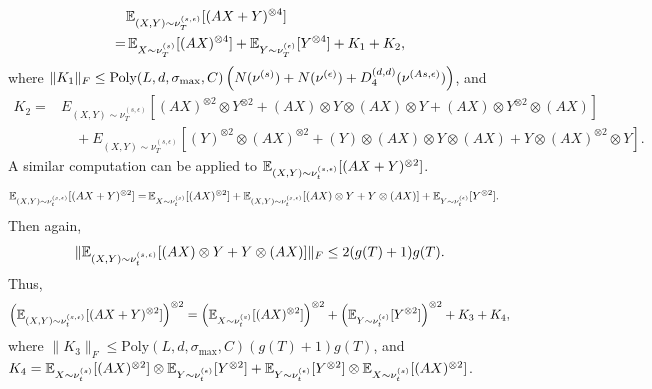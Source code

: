 \begin{align*}
& \mathbb{E}_{(X,Y)\sim \nu_T^{(s,\epsilon)}} [(AX+Y)^{\otimes 4}]\\
 = & \,\mathbb{E}_{X\sim \nu_T^{(s)}}[(AX)^{\otimes 4}] + \mathbb{E}_{Y\sim \nu_T^{(\epsilon)}}[Y^{\otimes 4}] + K_1 +K_2,
\end{align*}
where $\|K_1\|_F \le\text{Poly}(L, d, \sigma_{\max}, C)\left(N(\nu^{(s)})+N(\nu^{(\epsilon)})+D_4^{(d,d)}(\nu^{(As,\epsilon)}) \right) $, and 
\begin{align*}
K_2  = & E_{(X,Y)\sim \nu_T^{(s,\epsilon)}} [ (AX)^{\otimes 2}\otimes Y^{\otimes 2} + (AX)\otimes Y\otimes (AX)\otimes Y + (AX)\otimes Y^{\otimes 2}\otimes (AX)]\\
& \quad+  E_{(X,Y)\sim \nu_T^{(s,\epsilon)}} [ (Y)^{\otimes 2}\otimes (AX)^{\otimes 2} + (Y)\otimes (AX)\otimes Y\otimes (AX) + Y\otimes (AX)^{\otimes 2}\otimes Y]. 
\end{align*}
A similar computation can be applied to $\mathbb{E}_{(X,Y)\sim \nu_t^{(s,\epsilon)}} [(AX+Y)^{\otimes 2}]$.
\begin{align*}
\mathbb{E}_{(X,Y)\sim \nu_t^{(s,\epsilon)}} [(AX+Y)^{\otimes 2}]= & \, \mathbb{E}_{X\sim \nu_t^{(s)}}[(AX)^{\otimes 2}] + \mathbb{E}_{(X,Y)\sim \nu_t^{(s,\epsilon)}}[(AX)\otimes Y + Y\otimes (AX)] + \mathbb{E}_{Y\sim \nu_t^{(\epsilon)}}[Y^{\otimes 2}].
\end{align*}
Then again,
\[
\|\mathbb{E}_{(X,Y)\sim \nu_t^{(s,\epsilon)}}[(AX)\otimes Y + Y\otimes (AX)]\|_F \le 2(g(T)+1)g(T).
\]
Thus, 
\[
\left( \mathbb{E}_{(X,Y)\sim \nu_t^{(s,\epsilon)}} [(AX+Y)^{\otimes 2}]\right)^{\otimes2} =  \left(\mathbb{E}_{X\sim \nu_t^{(s)}}[(AX)^{\otimes 2}]\right)^{\otimes2} + \left( \mathbb{E}_{Y\sim \nu_t^{(\epsilon)}}[Y^{\otimes 2}]\right)^{\otimes 2} + K_3+K_4,
\]
where $\|K_3\|_F \le \text{Poly}(L, d, \sigma_{\max}, C)(g(T)+1)g(T) $, and $K_4 = \mathbb{E}_{X\sim \nu_t^{(s)}}[(AX)^{\otimes 2}] \otimes \mathbb{E}_{Y\sim \nu_t^{(\epsilon)}}[Y^{\otimes 2}] + \mathbb{E}_{Y\sim \nu_t^{(\epsilon)}}[Y^{\otimes 2}] \otimes \mathbb{E}_{X\sim \nu_t^{(s)}}[(AX)^{\otimes 2}]$.

